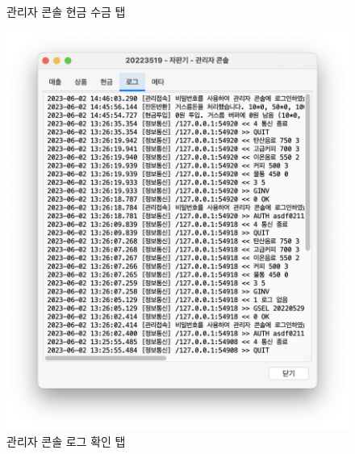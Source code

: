 \documentclass{oblivoir}
\begin{document}
\begin{figure}
\begin{minipage}{.5\textwidth}
            \caption{관리자 콘솔 현금 수금 탭}
            \label{fig:admin-cash}
        \end{minipage}
        \begin{minipage}{0.5\textwidth}
            \includegraphics[width=\textwidth]{images/snapshot/admin-log}
            \caption{관리자 콘솔 로그 확인 탭}
            \label{fig:admin-log}
        \end{minipage}%
        \begin{minipage}{0.5\textwidth}

\end{minipage}
\end{figure}
\end{document}
